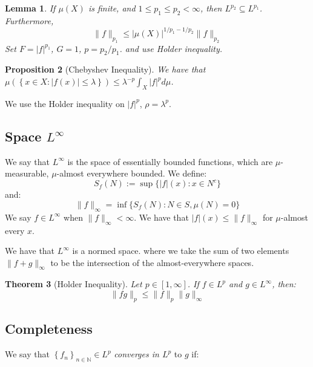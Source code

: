 \documentclass{article}
\newtheorem{theorem}{Theorem}
\newtheorem{proposition}[theorem]{Proposition}
\newtheorem{lemma}[theorem]{Lemma}
\theoremstyle{definition}
\numberwithin{theorem}{section}
\numberwithin{equation}{section}
\begin{document}
\begin{lemma}
	If $\mu(X)$ is finite, and $1 \leq p_1 \leq p_2 < \infty$, then $L^{p_2} \subseteq L^{p_1}$. Furthermore,
	\begin{equation}
		\| f\|_{p_1} \leq |\mu(X)|^{1/ p_1 - 1/p_2} \| f \|_{p_2}
	\end{equation}
	Set $F = |f|^{p_1}$, $G = 1$, $p = p_2/p_1$. and use Holder inequality.
\end{lemma}

\begin{proposition}[Chebyshev Inequality]
	We have that $\mu \left( \left\lbrace x \in X : |f(x)| \leq \lambda\right\rbrace   \right) \leq \lambda^{-p} \int_X |f|^p d{\mu}$. 
\end{proposition}
We use the Holder inequality on $|f|^p$, $\rho = \lambda^p$.

\subsection{Space $L^\infty$}
We say that $L^{\infty}$ is the space of essentially bounded functions, which are $\mu$-measurable, $\mu$-almost everywhere bounded.
We define:
\begin{equation}
	S_f(N) := \sup \lbrace |f|(x): x \in N^c \rbrace
\end{equation}
and:
\begin{equation}
	\|f \|_{\infty} = \inf \lbrace S_f(N): N \in S, \mu(N) = 0 \rbrace
\end{equation}
We say $f \in L^\infty$ when $\|f\|_{\infty} < \infty$. 
We have that $|f|(x) \leq \|f\|_{\infty}$ for $\mu$-almost every $x$. 

We have that $L^\infty$ is a normed space. where we take the sum of two elements $\|f + g \|_{\infty}$ to be the intersection of the almost-everywhere spaces. 
\begin{theorem}[Holder Inequality]
	Let $p \in [1, \infty]$. If $f \in L^p$ and $g \in L^\infty$, then:
	\begin{equation}
		\|fg \|_p \leq \|f\|_p \|g \|_\infty
	\end{equation}
\end{theorem}

\subsection{Completeness}
We say that $\left\lbrace f_n \right\rbrace_{n \in \mathbb{N}} \in L^p$ \textit{converges in $L^p$} to $g$ if:
\end{document}

